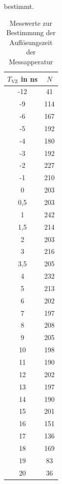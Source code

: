 bestimmt.
\begin{table}
\centering
\caption{Messwerte zur Bestimmung der Auflösungszeit der Messapperatur}
\label{tab:Verzoegerung}
\begin{tabular}{c|c}
$T_{\text{VZ}}$ in ns& $N$\\
\hline
-12& 41\\
-9& 114\\
-6& 167\\
-5& 192\\
-4& 180\\
-3& 192\\
-2& 227\\
-1& 210\\
0& 203\\
0,5& 203\\
1& 242\\
1,5& 214\\
2& 203\\
3& 216\\
3,5& 205\\
4& 232\\
5& 213\\
6& 202\\
7& 197\\
8& 208\\
9& 205\\
10& 198\\
11& 190\\
12& 202\\
13& 197\\
14& 190\\
15& 201\\
16& 151\\
17& 136\\
18& 169\\
19& 83\\
20& 36\\
\end{tabular}
\end{table}
